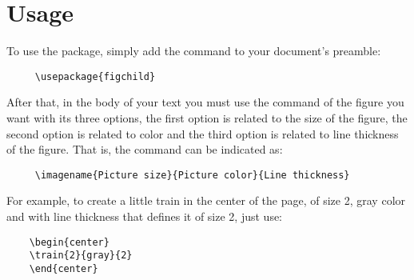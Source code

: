 \documentclass{article}
\begin{document}
\section{Usage}

\hspace{\parindent}To use the package, simply add the command to your document's preamble:

\begin{verbatim}
     \usepackage{figchild}
\end{verbatim}

After that, in the body of your text you must use the command of the figure you want with its three options, the first option is related to the size of the figure, the second option is related to color and the third option is related to line thickness of the figure. That is, the command can be indicated as:

\begin{verbatim}
     \imagename{Picture size}{Picture color}{Line thickness}
\end{verbatim}

For example, to create a little train in the center of the page, of size 2, gray color and with line thickness that defines it of size 2, just use:

\begin{verbatim}
    \begin{center}
    \train{2}{gray}{2}
    \end{center}
\end{verbatim}

\begin{center}
\end{center}


\end{document}
